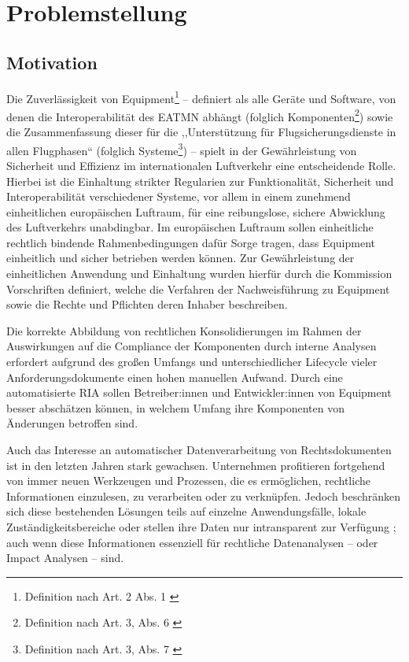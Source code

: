 \chapter{Problemstellung}

    \section{Motivation}

        Die Zuverlässigkeit von \atmans{} Equipment\footnote{Definition nach  Art. 2 Abs. 1 \cite{2023R1769}}  -- definiert als alle Geräte und Software, von denen die Interoperabilität des \ac{EATMN} abhängt (folglich \atmans{} Komponenten\footnote{Definition nach  Art. 3, Abs. 6 \cite{2018R1139}})  sowie die Zusammenfassung dieser für die ,,Unterstützung für Flugsicherungsdienste in allen Flugphasen`` (folglich \atmans{} Systeme\footnote{Definition nach  Art. 3, Abs. 7 \cite{2018R1139}}) -- spielt in der Gewährleistung von Sicherheit und Effizienz im internationalen Luftverkehr eine entscheidende Rolle. 
        Hierbei ist die Einhaltung strikter Regularien zur Funktionalität, Sicherheit und Interoperabilität verschiedener Systeme, vor allem in einem zunehmend einheitlichen europäischen Luftraum, für eine reibungslose, sichere Abwicklung des Luftverkehrs unabdingbar. 
        Im europäischen Luftraum sollen einheitliche rechtlich bindende Rahmenbedingungen dafür Sorge tragen, dass \atmans{} Equipment einheitlich und sicher betrieben werden können.
        Zur Gewährleistung der einheitlichen Anwendung und Einhaltung wurden hierfür durch die Kommission Vorschriften definiert, welche die Verfahren der Nachweisführung zu \atmans{} Equipment sowie die Rechte und Pflichten deren Inhaber beschreiben. \cite[Art. 43]{2018R1139} 
            
        Die korrekte Abbildung von rechtlichen Konsolidierungen im Rahmen der Auswirkungen auf die Compliance der \atmans{} Komponenten durch interne Analysen erfordert aufgrund des großen Umfangs und unterschiedlicher Lifecycle vieler Anforderungsdokumente einen hohen manuellen Aufwand.
        Durch eine automatisierte \ac{RIA} sollen Betreiber:innen und Entwickler:innen von \atmans Equipment besser abschätzen können, in welchem Umfang ihre Komponenten von Änderungen betroffen sind. 

    Auch das Interesse an automatischer Datenverarbeitung von Rechtsdokumenten ist in den letzten Jahren stark gewachsen.
    Unternehmen profitieren fortgehend von immer neuen Werkzeugen und Prozessen, die es ermöglichen, rechtliche Informationen einzulesen, zu verarbeiten oder zu verknüpfen.
    Jedoch beschränken sich diese bestehenden Lösungen teils auf einzelne Anwendungsfälle, lokale Zuständigkeitsbereiche oder stellen ihre Daten nur intransparent zur Verfügung \cite[385]{eu_open_legal_info}; auch wenn diese Informationen essenziell für rechtliche Datenanalysen -- oder Impact Analysen -- sind.
        
